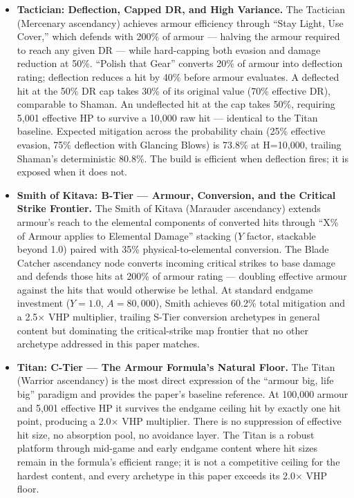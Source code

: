\documentclass[12pt, letterpaper]{article}
\begin{document}
\begin{itemize}
    \item \textbf{Tactician: Deflection, Capped DR, and High Variance.} The Tactician (Mercenary ascendancy) achieves armour efficiency through ``Stay Light, Use Cover,'' which defends with 200\% of armour --- halving the armour required to reach any given DR --- while hard-capping both evasion and damage reduction at 50\%. ``Polish that Gear'' converts 20\% of armour into deflection rating; deflection reduces a hit by 40\% before armour evaluates. A deflected hit at the 50\% DR cap takes 30\% of its original value (70\% effective DR), comparable to Shaman. An undeflected hit at the cap takes 50\%, requiring 5{,}001 effective HP to survive a 10{,}000 raw hit --- identical to the Titan baseline. Expected mitigation across the probability chain (25\% effective evasion, 75\% deflection with Glancing Blows) is 73.8\% at H=10{,}000, trailing Shaman's deterministic 80.8\%. The build is efficient when deflection fires; it is exposed when it does not.

    \item \textbf{Smith of Kitava: B-Tier --- Armour, Conversion, and the Critical Strike Frontier.} The Smith of Kitava (Marauder ascendancy) extends armour's reach to the elemental components of converted hits through ``X\% of Armour applies to Elemental Damage'' stacking ($Y$ factor, stackable beyond 1.0) paired with 35\% physical-to-elemental conversion. The Blade Catcher ascendancy node converts incoming critical strikes to base damage and defends those hits at 200\% of armour rating --- doubling effective armour against the hits that would otherwise be lethal. At standard endgame investment ($Y = 1.0$, $A = 80{,}000$), Smith achieves 60.2\% total mitigation and a 2.5$\times$ VHP multiplier, trailing S-Tier conversion archetypes in general content but dominating the critical-strike map frontier that no other archetype addressed in this paper matches.

    \item \textbf{Titan: C-Tier --- The Armour Formula's Natural Floor.} The Titan (Warrior ascendancy) is the most direct expression of the ``armour big, life big'' paradigm and provides the paper's baseline reference. At 100{,}000 armour and 5{,}001 effective HP it survives the endgame ceiling hit by exactly one hit point, producing a 2.0$\times$ VHP multiplier. There is no suppression of effective hit size, no absorption pool, no avoidance layer. The Titan is a robust platform through mid-game and early endgame content where hit sizes remain in the formula's efficient range; it is not a competitive ceiling for the hardest content, and every archetype in this paper exceeds its 2.0$\times$ VHP floor.
\end{itemize}
\end{document}
